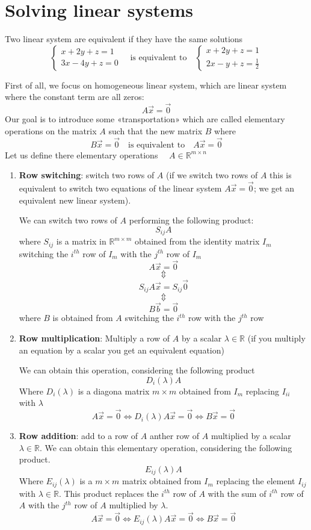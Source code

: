 \section{Solving linear systems}
\begin{definition}
    Two linear system are equivalent if they have the same solutions 
    $$\begin{cases}
        x + 2y + z = 1 \\
        3x -4y +z = 0
    \end{cases} \quad \text{is equivalent to} \quad \begin{cases}
        x+2y+z = 1 \\
        2x - y +z = \frac{1}{2}
    \end{cases} $$
\end{definition}
First of all, we focus on homogeneous linear system, which are linear system where the constant term are all zeros: 
$$A \vec x = \vec 0$$
Our goal is to introduce some «transportation» which are called elementary operations on the matrix $A$ such that the new matrix $B$ where
$$B \vec x = \vec 0 \quad \text{is equivalent to} \quad A\vec x = \vec 0$$
Let us define there elementary operations $\quad A \in \mathbb{R}^{m\times n}$
\begin{enumerate}
    \item \textbf{Row switching}: switch two rows of $A$ (if we switch two rows of $A$ this is equivalent to switch two equations of the linear system $A \vec x = \vec 0$; we get an equivalent new linear system).
    
    We can switch two rows of  $A$ performing the following product:
    $$S_{ij}A$$
    where $S_{ij}$ is a matrix in $\mathbb{R}^{m\times m}$ obtained from the identity matrix $I_m$ switching the $i^{th}$ row of $I_m$ with the $j^{th}$ row of $I_m$
    $$A \vec x = \vec 0$$
    $$\Updownarrow$$
    $$S_{ij}A \vec x = S_{ij} \vec 0$$
    $$\Updownarrow$$
    $$B \vec b = \vec 0 $$
    where $B$ is obtained from $A$ switching the $i^{th}$ row with the $j^{th}$ row
    \item \textbf{Row multiplication}: Multiply a row of $A$ by a scalar $\lambda \in \mathbb{R}$ (if you multiply an equation by  a scalar you get an equivalent equation)

    We can obtain this operation, considering the following product
    $$D_i(\lambda)A$$
    Where $D_i(\lambda)$  is a diagona matrix $m \times m$ obtained from $I_m$ replacing $I_{ii}$ with $\lambda$
    $$A \vec x = \vec 0 \iff D_i(\lambda)A \vec x = \vec 0 \iff B \vec x = \vec 0$$
    \item \textbf{Row addition}: add to a row of $A$ anther row of $A$ multiplied by a scalar $\lambda \in \mathbb{R}$. We can obtain this elementary operation, considering the following product.
    $$E_{ij} (\lambda) A$$
    Where $E_{ij}(\lambda)$ is a $m \times m$ matrix obtained from $I_m$ replacing the element $I_{ij}$ with $\lambda \in \mathbb{R}$. This product replaces the $i^{th}$ row of $A$ with the sum of $i^{th}$ row of $A$ with the $j^{th}$ row of $A$ multiplied by $\lambda$. 
    $$A\vec x = \vec 0 \iff E_{ij}(\lambda)A \vec x = \vec 0 \iff B \vec x = \vec 0$$
\end{enumerate}
